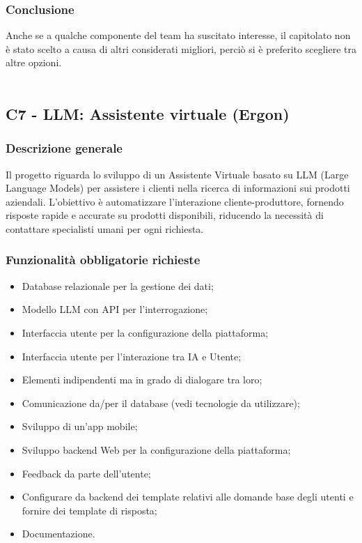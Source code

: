 \documentclass[10pt]{article}
\begin{document}
\subsubsection{Conclusione}
Anche se a qualche componente del team ha suscitato interesse, il capitolato non è stato scelto a causa di altri considerati migliori, perciò si è preferito scegliere tra altre opzioni.
\\\\
\subsection{C7 - LLM: Assistente virtuale (Ergon)}
\subsubsection{Descrizione generale}
Il progetto riguarda lo sviluppo di un Assistente Virtuale basato su LLM (Large Language Models) per assistere i clienti nella ricerca di informazioni sui prodotti aziendali. L'obiettivo è automatizzare l'interazione cliente-produttore, fornendo risposte rapide e accurate su prodotti disponibili, riducendo la necessità di contattare specialisti umani per ogni richiesta.

\subsubsection{Funzionalità obbligatorie richieste}
\begin{itemize}
 \item Database relazionale per la gestione dei dati;
 \item Modello LLM con API per l’interrogazione;
 \item Interfaccia utente per la configurazione della piattaforma;
 \item Interfaccia utente per l'interazione tra IA e Utente;
 \item Elementi indipendenti ma in grado di dialogare tra loro;
 \item Comunicazione da/per il database (vedi tecnologie da utilizzare);
 \item Sviluppo di un'app mobile;
 \item Sviluppo backend Web per la configurazione della piattaforma;
 \item Feedback da parte dell’utente;
 \item Configurare da backend dei template relativi alle domande base degli utenti e fornire dei template di risposta;
 \item Documentazione.
\end{itemize}
\end{document}
